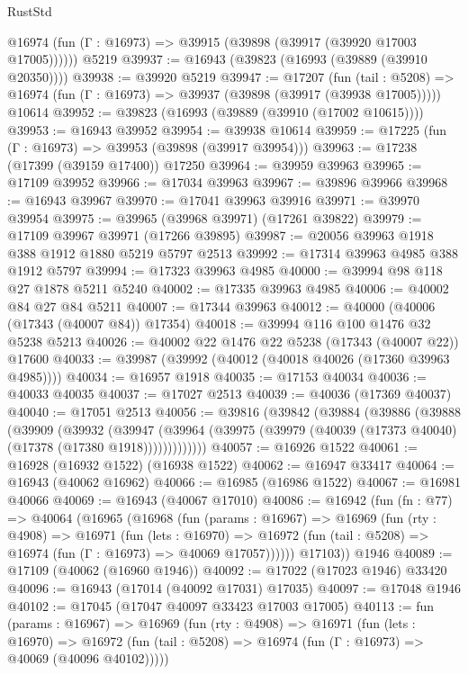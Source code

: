 \begin{lexlean}{RustStd}
\begin{coremodule}
      @16974 (fun (Γ : @16973) => @39915 (@39898 (@39917 (@39920 @17003 @17005))))))
    @5219
@39937 := @16943 (@39823 (@16993 (@39889 (@39910 @20350))))
@39938 := @39920 @5219
@39947 := @17207
    (fun (tail : @5208) => @16974 (fun (Γ : @16973) => @39937 (@39898 (@39917 (@39938 @17005)))))
    @10614
@39952 := @39823 (@16993 (@39889 (@39910 (@17002 @10615))))
@39953 := @16943 @39952
@39954 := @39938 @10614
@39959 := @17225 (fun (Γ : @16973) => @39953 (@39898 (@39917 @39954)))
@39963 := @17238 (@17399 (@39159 @17400)) @17250
@39964 := @39959 @39963
@39965 := @17109 @39952
@39966 := @17034 @39963
@39967 := @39896 @39966
@39968 := @16943 @39967
@39970 := @17041 @39963 @39916
@39971 := @39970 @39954
@39975 := @39965 (@39968 @39971) (@17261 @39822)
@39979 := @17109 @39967 @39971 (@17266 @39895)
@39987 := @20056 @39963 @1918 @388 @1912 @1880 @5219 @5797 @2513
@39992 := @17314 @39963 @4985 @388 @1912 @5797
@39994 := @17323 @39963 @4985
@40000 := @39994 @98 @118 @27 @1878 @5211 @5240
@40002 := @17335 @39963 @4985
@40006 := @40002 @84 @27 @84 @5211
@40007 := @17344 @39963
@40012 := @40000 (@40006 (@17343 (@40007 @84)) @17354)
@40018 := @39994 @116 @100 @1476 @32 @5238 @5213
@40026 := @40002 @22 @1476 @22 @5238 (@17343 (@40007 @22)) @17600
@40033 := @39987 (@39992 (@40012 (@40018 @40026 (@17360 @39963 @4985))))
@40034 := @16957 @1918
@40035 := @17153 @40034
@40036 := @40033 @40035
@40037 := @17027 @2513
@40039 := @40036 (@17369 @40037)
@40040 := @17051 @2513
@40056 := @39816
    (@39842
      (@39884
        (@39886
          (@39888
            (@39909
              (@39932
                (@39947
                  (@39964 (@39975 (@39979 (@40039 (@17373 @40040) (@17378 (@17380 @1918)))))))))))))
@40057 := @16926 @1522
@40061 := @16928 (@16932 @1522) (@16938 @1522)
@40062 := @16947 @33417
@40064 := @16943 (@40062 @16962)
@40066 := @16985 (@16986 @1522)
@40067 := @16981 @40066
@40069 := @16943 (@40067 @17010)
@40086 := @16942
    (fun (fn : @77) =>
    @40064
      (@16965
        (@16968
          (fun (params : @16967) =>
          @16969
            (fun (rty : @4908) =>
            @16971
              (fun (lets : @16970) =>
              @16972 (fun (tail : @5208) => @16974 (fun (Γ : @16973) => @40069 @17057))))))
        @17103))
    @1946
@40089 := @17109 (@40062 (@16960 @1946))
@40092 := @17022 (@17023 @1946) @33420
@40096 := @16943 (@17014 (@40092 @17031) @17035)
@40097 := @17048 @1946
@40102 := @17045 (@17047 @40097 @33423 @17003 @17005)
@40113 := fun (params : @16967) =>
  @16969
    (fun (rty : @4908) =>
    @16971
      (fun (lets : @16970) =>
      @16972 (fun (tail : @5208) => @16974 (fun (Γ : @16973) => @40069 (@40096 @40102)))))

\end{coremodule}
\end{lexlean}
